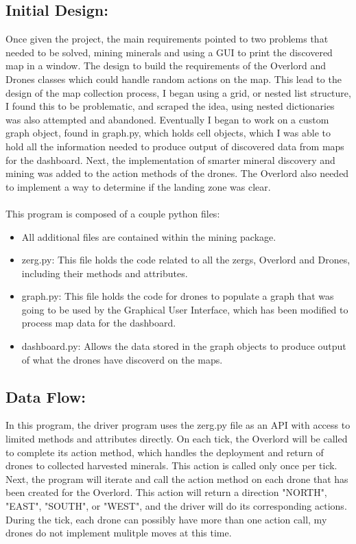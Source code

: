 \documentclass{article}
\begin{document}
\subsection{Initial Design:}
    Once given the project, the main requirements pointed to two problems that needed to be solved, mining minerals and using a GUI to print the discovered map in a window. The design to build the requirements of the Overlord and Drones classes which could handle random actions on the map.  This lead to the design of the map collection process, I began using a grid, or nested list structure, I found this to be problematic, and scraped the idea, using nested dictionaries was also attempted and abandoned. Eventually I began to work on a custom graph object, found in graph.py, which holds cell objects, which I was able to hold all the information needed to produce output of discovered data from maps for the dashboard. Next, the implementation of smarter mineral discovery and mining was added to the action methods of the drones. The Overlord also needed to implement a way to determine if the landing zone was clear. 
	  \\\\
	  This program is composed of a couple python files:
    \begin{itemize}
      \item All additional files are contained within the mining package.
      
        \item zerg.py: This file holds the code related to all the zergs, Overlord and Drones, including their methods and attributes.
        \item graph.py: This file holds the code for drones to populate a graph that was going to be used by the Graphical User Interface, which has been modified to process map data for the dashboard.
        \item dashboard.py: Allows the data stored in the graph objects to produce output of what the drones have discoverd on the maps. 
    \end{itemize}

\subsection{Data Flow:}

    In this program, the driver program uses the zerg.py file as an API with access to limited methods and attributes directly. On each tick, the Overlord will be called to complete its action method, which handles the deployment and return of drones to collected harvested minerals. This action is called only once per tick. Next, the program will iterate and call the action method on each drone that has been created for the Overlord.  This action will return a direction "NORTH", "EAST", "SOUTH", or "WEST", and the driver will do its corresponding actions.  During the tick, each drone can possibly have more than one action call, my drones do not implement mulitple moves at this time. 
\end{document}
